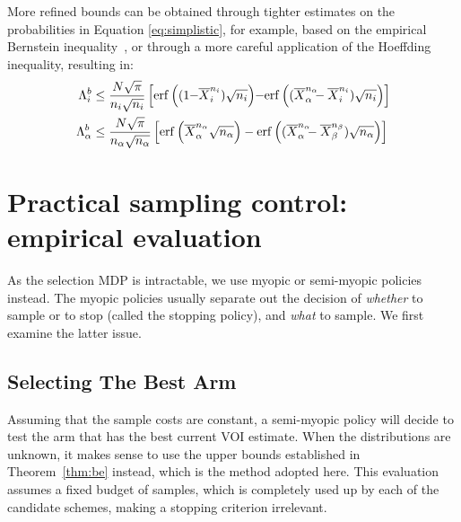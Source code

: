 \documentclass[]{article}
\begin{document}
More refined bounds can be obtained through tighter estimates on the
probabilities in Equation \ref{eq:simplistic}, for example, based on the empirical Bernstein
inequality~\citep{MaurerPontil.benrstein}, or through a more careful
application of the Hoeffding inequality, resulting in:
\begin{align}
\Lambda_i^b&\le\frac {N\sqrt \pi} {n_i \sqrt {n_i}}
  \left[\mathrm{erf}\left((1\hspace{-0.25em}-\hspace{-0.25em}\overline X_i^{n_i})\sqrt {n_i}\right)
      \hspace{-0.25em}-\hspace{-0.25em}\mathrm{erf}\left((\overline X_\alpha^{n_\alpha}\hspace{-0.5em} - \overline X_i^{n_i})\sqrt{n_i}\right)\right]\nonumber\\
\Lambda_\alpha^b&\le\frac {N\sqrt \pi} {n_\alpha \sqrt {n_\alpha}}
  \left[\mathrm{erf}\left(\overline X_\alpha^{n_\alpha}\sqrt {n_\alpha}\right)
      -\mathrm{erf}\left((\overline X_\alpha^{n_\alpha}\hspace{-0.5em} - \overline X_\beta^{n_\beta})\sqrt{n_\alpha}\right)\right]
\label{eqn:erf-blinkered}
\end{align}


\section{Practical sampling control: empirical evaluation}
\label{sec:empirical-evaluation}\label{mcts-section}

As the selection MDP is intractable, we use myopic or semi-myopic policies instead.
The myopic policies usually separate out the decision of {\em whether} to
sample or to stop (called the stopping policy), and {\em what} to sample.
We first examine the latter issue. 

\subsection{Selecting The Best Arm}
\label{sec:emp-arm}

Assuming that the sample costs are constant,
a semi-myopic policy will decide to test the arm that has the best
current VOI estimate. 
When the distributions are unknown, it makes sense
to use the upper bounds established in Theorem~\ref{thm:be} instead,
which is the method adopted here.
This evaluation assumes a fixed budget of samples, which is
completely used up by each of the candidate schemes, making a stopping
criterion irrelevant.
\end{document}
